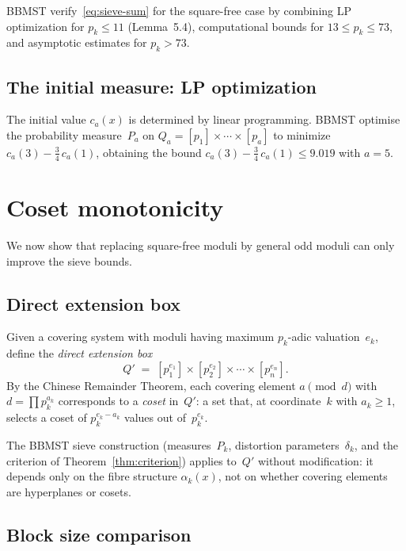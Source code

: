 \documentclass[11pt]{amsart}
\theoremstyle{definition}
\theoremstyle{remark}
\begin{document}
BBMST verify~\eqref{eq:sieve-sum} for the square-free case by combining
LP optimization for $p_k \le 11$ (Lemma~5.4), computational bounds
for $13 \le p_k \le 73$, and asymptotic estimates for $p_k > 73$.

\subsection{The initial measure: LP optimization}\label{subsec:LP}

The initial value $c_a(x)$ is determined by linear programming.
BBMST optimise the probability measure~$P_a$ on
$Q_a = [p_1] \times \cdots \times [p_a]$
to minimize $c_a(3) - \frac{3}{4}\,c_a(1)$, obtaining the bound
$c_a(3) - \frac{3}{4}\,c_a(1) \le 9.019$ with $a = 5$.

\section{Coset monotonicity}\label{sec:monotonicity}

We now show that replacing square-free moduli by general odd moduli
can only improve the sieve bounds.

\subsection{Direct extension box}

Given a covering system with moduli having maximum $p_k$-adic
valuation~$e_k$, define the \emph{direct extension box}
\[
  Q' \;=\; [p_1^{e_1}] \times [p_2^{e_2}] \times \cdots \times [p_n^{e_n}].
\]
By the Chinese Remainder Theorem, each covering element $a \pmod{d}$
with $d = \prod p_k^{a_k}$ corresponds to a \emph{coset} in~$Q'$:
a set that, at coordinate~$k$ with $a_k \ge 1$, selects a coset of
$p_k^{e_k - a_k}$ values out of~$p_k^{e_k}$.

The BBMST sieve construction (measures~$P_k$, distortion parameters~$\delta_k$,
and the criterion of Theorem~\ref{thm:criterion}) applies to~$Q'$ without
modification: it depends only on the fibre structure $\alpha_k(x)$, not on
whether covering elements are hyperplanes or cosets.

\subsection{Block size comparison}
\end{document}

